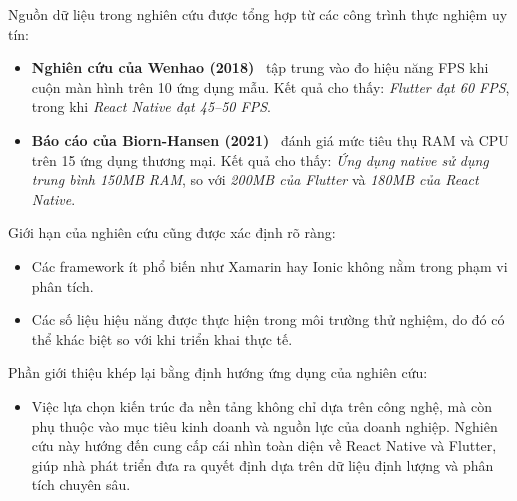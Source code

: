     Nguồn dữ liệu trong nghiên cứu được tổng hợp từ các công trình thực nghiệm uy tín:
    \setlength{\leftmargini}{1.0cm}
    \begin{itemize}
        \item \textbf{Nghiên cứu của Wenhao (2018)}~\cite{wenhao2018} tập trung vào đo hiệu năng FPS khi cuộn màn hình trên 10 ứng dụng mẫu. Kết quả cho thấy: \textit{Flutter đạt 60 FPS}, trong khi \textit{React Native đạt 45–50 FPS}.
        \item \textbf{Báo cáo của Biorn-Hansen (2021)}~\cite{biornhansen2021} đánh giá mức tiêu thụ RAM và CPU trên 15 ứng dụng thương mại. Kết quả cho thấy: \textit{Ứng dụng native sử dụng trung bình 150MB RAM}, so với \textit{200MB của Flutter} và \textit{180MB của React Native}.
    \end{itemize}
\vspace{0.5em}


    Giới hạn của nghiên cứu cũng được xác định rõ ràng:
    \setlength{\leftmargini}{1.0cm}
    \begin{itemize}
        \item Các framework ít phổ biến như Xamarin hay Ionic không nằm trong phạm vi phân tích.
        \item Các số liệu hiệu năng được thực hiện trong môi trường thử nghiệm, do đó có thể khác biệt so với khi triển khai thực tế.
    \end{itemize}
\vspace{0.5em}


    Phần giới thiệu khép lại bằng định hướng ứng dụng của nghiên cứu:
    \setlength{\leftmargini}{1.0cm}
    \begin{itemize}
        \item Việc lựa chọn kiến trúc đa nền tảng không chỉ dựa trên công nghệ, mà còn phụ thuộc vào mục tiêu kinh doanh và nguồn lực của doanh nghiệp. Nghiên cứu này hướng đến cung cấp cái nhìn toàn diện về React Native và Flutter, giúp nhà phát triển đưa ra quyết định dựa trên dữ liệu định lượng và phân tích chuyên sâu.
    \end{itemize}
